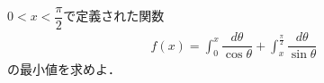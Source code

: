 \documentclass[../../main.tex]{subfiles}
\begin{document}
$\displaystyle0<x<\dfrac{\pi}{2}$で定義された関数
\begin{align}
  f(x)=\int_0^x\dfrac{d\theta}{\cos\theta}+\int_x^{\frac{\pi}{2}}\dfrac{d\theta}{\sin\theta}
\end{align}
の最小値を求めよ．
\end{document}
